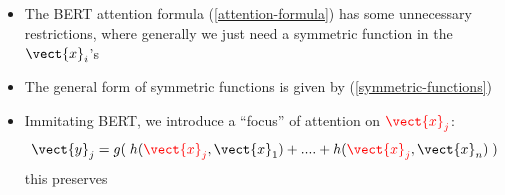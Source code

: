 \subsection{}
\begin{itemize}
	\item The BERT attention formula (\ref{attention-formula}) has some unnecessary restrictions, where generally we just need a symmetric function in the $\vect{x}_i$'s
	
	\item The general form of symmetric functions is given by (\ref{symmetric-functions})
	
	\item Immitating BERT, we introduce a ``focus'' of attention on ${\color{red}\vect{x}_j}$:
	\begin{equation}
	\vect{y}_j = g( \; h({\color{red}\vect{x}_j}, \vect{x}_1) + .... + h({\color{red}\vect{x}_j}, \vect{x}_n) \; )
	\end{equation}
	this preserves 
	

\end{itemize}
